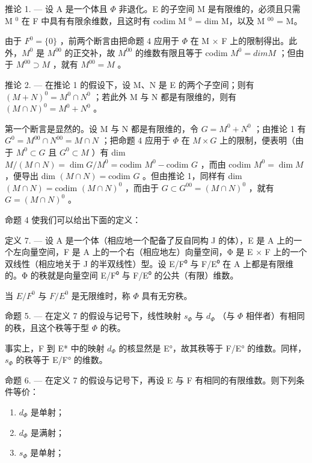 推论 1. --- 设 A 是一个体且 \(\Phi\) 非退化。E 的子空间 M 是有限维的，必须且只需 M \(^{0}\) 在 F 中具有有限余维数，且这时有 codim M \(^{0}\) = dim M，以及 M \(^{00}\) = M。

由于 \(F^{0}=\{0\}\) ，前两个断言由把命题 4 应用于 \(\Phi\) 在 M × F 上的限制得出。此外，\(M^{0}\) 是 \(M^{00}\) 的正交补，故 \(M^{00}\) 的维数有限且等于 codim \(M^{0}=dim M\) ；但由于 \(M^{00}\supset M\) ，就有 \(M^{00}=M\) 。

推论 2. --- 在推论 1 的假设下，设 M、N 是 E 的两个子空间；则有 \((M + N)^{0} = M^{0} \cap N^{0}\) ；若此外 M 与 N 都是有限维的，则有 \((M \cap N)^{0} = M^{0} + N^{0}\) 。

第一个断言是显然的。设 M 与 N 都是有限维的，令 \(G = M^{0} + N^{0}\) ；由推论 1 有 \(G^{0} = M^{00} \cap N^{00} = M \cap N\) ；把命题 4 应用于 \(\Phi\) 在 \(M \times G\) 上的限制，便表明（由于 \(M^{0} \subset G\) 且 \(G^{0} \subset M\) ）有 dim \(M/(M \cap N) = \dim G/M^{0} = \text{codim } M^{0} - \text{codim } G\) ，而由 codim \(M^{0} = \dim M\) ，便导出 dim \((M \cap N) = \text{codim } G\) 。但由推论 1，同样有 dim \((M \cap N) = \text{codim } (M \cap N)^{0}\) ，而由于 \(G \subset G^{00} = (M \cap N)^{0}\) ，就有 \(G = (M \cap N)^{0}\) 。

命题 4 使我们可以给出下面的定义：

定义 7. --- 设 A 是一个体（相应地一个配备了反自同构 J 的体），E 是 A 上的一个左向量空间，F 是 A 上的一个右（相应地左）向量空间，Φ 是 E × F 上的一个双线性（相应地关于 J 的半双线性）型。设 E/F⁰ 与 F/E⁰ 在 A 上都是有限维的。Φ 的秩就是向量空间 E/F⁰ 与 F/E⁰ 的公共（有限）维数。

当 \(E/F^{0}\) 与 \(F/E^{0}\) 是无限维时，称 \(\Phi\) 具有无穷秩。

命题 5. --- 在定义 7 的假设与记号下，线性映射 \(s_{\Phi}\) 与 \(d_{\Phi}\) （与 \(\Phi\) 相伴者）有相同的秩，且这个秩等于型 \(\Phi\) 的秩。

事实上，F 到 E* 中的映射 \(d_{\Phi}\) 的核显然是 E°，故其秩等于 F/E° 的维数。同样，\(s_{\Phi}\) 的秩等于 E/F° 的维数。

命题 6. --- 在定义 7 的假设与记号下，再设 E 与 F 有相同的有限维数。则下列条件等价：

\begin{enumerate}
\def\labelenumi{\alph{enumi})}
\item
  \(d_{\Phi}\) 是单射；
\item
  \(d_{\Phi}\) 是满射；
\item
  \(s_{\Phi}\) 是单射；
\end{enumerate}

